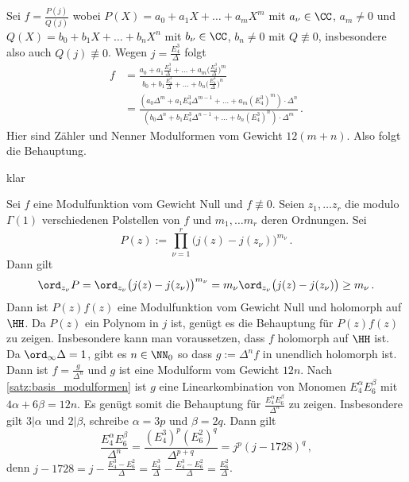 \begin{bewe-list}
	\item[(iii) $\Rightarrow$ (ii)] Sei $f = \frac{P(j)}{Q(j)}$ wobei $P(X) = a_0 + a_1X + \ldots + a_mX^m$ mit $a_\nu \in \CC$, $a_m \not= 0$ und $Q(X) = b_0 + b_1X + \ldots + b_nX^n$ mit $b_\nu \in \CC$, $b_n \not= 0$ mit $Q \not\equiv 0$, insbesondere also auch $Q(j) \not\equiv 0$.
	Wegen $j = \frac{E_4^3}{\Delta}$ folgt
	\begin{align*}
		f
		&= \frac{a_0 + a_1\frac{E_4^3}{\Delta} + \ldots + a_m\bigl(\frac{E_4^3}{\Delta}\bigr)^m}{b_0 + b_1\frac{E_4^3}{\Delta} + \ldots + b_n\bigl(\frac{E_4^3}{\Delta}\bigr)^n} \\
		&= \frac{(a_0\Delta^m + a_1E_4^3\Delta^{m-1} + \ldots + a_m(E_4^3)^m)\cdot \Delta^n}{(b_0\Delta^n + b_1E_4^3\Delta^{n-1} + \ldots + b_n(E_4^3)^n) \cdot \Delta^m}
		\,.
	\end{align*}
	Hier sind Zähler und Nenner Modulformen vom Gewicht $12(m+n)$.
	Also folgt die Behauptung.
	
	\item[(ii) $\Rightarrow$ (i)] klar
	
	\item[(i) $\Rightarrow$ (iii)] Sei $f$ eine Modulfunktion vom Gewicht Null und $f \not\equiv 0$.
	Seien $z_1, \ldots z_r$ die modulo $\Gamma(1)$ verschiedenen Polstellen von $f$ und $m_1, \ldots m_r$ deren Ordnungen.
	Sei
	\[
		P(z)
		:= \prod_{\nu = 1}^r \bigl(j(z) - j(z_\nu)\bigr)^{m_\nu}
		\,.
	\]
	Dann gilt
	\[
		\ord_{z_\nu} P
		= \ord_{z_\nu} \bigl(j(z) - j(z_\nu)\bigr)^{m_\nu}
		= m_\nu \ord_{z_\nu} \bigl(j(z) - j(z_\nu)\bigr)
		\geq m_\nu
		\,.
	\]
	Dann ist $P(z)f(z)$ eine Modulfunktion vom Gewicht Null und holomorph auf $\HH$.
	Da $P(z)$ ein Polynom in $j$ ist, genügt es die Behauptung für $P(z)f(z)$ zu zeigen.
	Insbesondere kann man voraussetzen, dass $f$ holomorph auf $\HH$ ist.
	Da $\ord_\infty \Delta = 1$, gibt es $n\in\NN_0$ so dass $g := \Delta^nf$ in unendlich holomorph ist.
	Dann ist $f = \frac{g}{\Delta^n}$ und $g$ ist eine Modulform vom Gewicht $12n$.
	Nach \autoref{satz:basis_modulformen} ist $g$ eine Linearkombination von Monomen $E_4^\alpha E_6^\beta$ mit $4\alpha + 6\beta = 12n$.
	Es genügt somit die Behauptung für $\frac{E_4^\alpha E_6^\beta}{\Delta^n}$ zu zeigen.
	Insbesondere gilt $3|\alpha$ und $2|\beta$, schreibe $\alpha = 3p$ und $\beta = 2q$.
	Dann gilt
	\[
		\frac{E_4^\alpha E_6^\beta}{\Delta^n}
		= \frac{(E_4^3)^p (E_6^2)^q}{\Delta^{p+q}}
		= j^p (j-1728)^q
		\,,
	\]
	denn $j-1728 = j - \frac{E_4^3 - E_6^2}{\Delta} = \frac{E_4^3}{\Delta} - \frac{E_4^3-E_6^2}{\Delta} = \frac{E_6^2}{\Delta}$.
\end{bewe-list}

